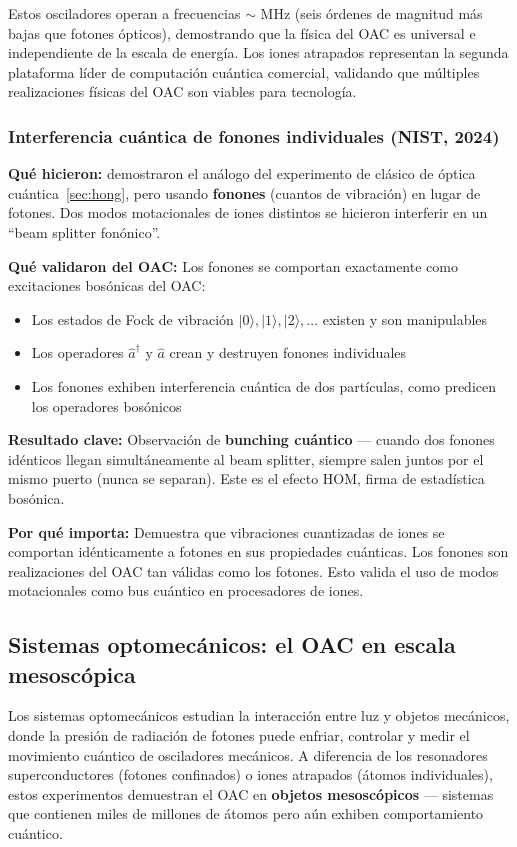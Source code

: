 \documentclass[11pt,a4paper,spanish]{book}
\begin{document}
Estos osciladores operan a frecuencias $\sim$ MHz (seis órdenes de magnitud más bajas que fotones ópticos), demostrando que la física del OAC es universal e independiente de la escala de energía. Los iones atrapados representan la segunda plataforma líder de computación cuántica comercial, validando que múltiples realizaciones físicas del OAC son viables para tecnología.



\subsubsection{Interferencia cuántica de fonones individuales (NIST, 2024)}

\textbf{Qué hicieron:} \cite{hou2024} demostraron el análogo del experimento de \cite{hong1987} clásico de óptica cuántica~\ref{sec:hong}, pero usando \textbf{fonones} (cuantos de vibración) en lugar de fotones. Dos modos motacionales de iones distintos se hicieron interferir en un ``beam splitter fonónico''.

\textbf{Qué validaron del OAC:} Los fonones se comportan exactamente como excitaciones bosónicas del OAC:
\begin{itemize}
	\item Los estados de Fock de vibración $|0\rangle, |1\rangle, |2\rangle, \ldots$ existen y son manipulables
	\item Los operadores $\hat{a}^\dagger$ y $\hat{a}$ crean y destruyen fonones individuales
	\item Los fonones exhiben interferencia cuántica de dos partículas, como predicen los operadores bosónicos
\end{itemize}

\textbf{Resultado clave:} Observación de \textbf{bunching cuántico} — cuando dos fonones idénticos llegan simultáneamente al beam splitter, siempre salen juntos por el mismo puerto (nunca se separan). Este es el efecto HOM, firma de estadística bosónica.

\textbf{Por qué importa:} Demuestra que vibraciones cuantizadas de iones se comportan idénticamente a fotones en sus propiedades cuánticas. Los fonones son realizaciones del OAC tan válidas como los fotones. Esto valida el uso de modos motacionales como bus cuántico en procesadores de iones.




\subsection*{Sistemas optomecánicos: el OAC en escala mesoscópica}
Los sistemas optomecánicos estudian la interacción entre luz y objetos mecánicos, donde la presión de radiación de fotones puede enfriar, controlar y medir el movimiento cuántico de osciladores mecánicos. A diferencia de los resonadores superconductores (fotones confinados) o iones atrapados (átomos individuales), estos experimentos demuestran el OAC en \textbf{objetos mesoscópicos} — sistemas que contienen miles de millones de átomos pero aún exhiben comportamiento cuántico.\\
\end{document}
